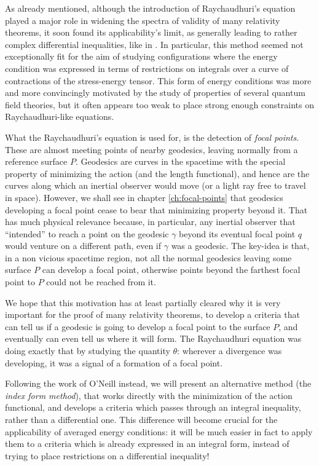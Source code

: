 As already mentioned, although the introduction of Raychaudhuri's equation played a major role in widening the spectra of validity of many relativity theorems, it soon found its applicability's limit, as generally leading to rather complex differential inequalities, like in \cite[]{fewster2011singularity}.
In particular, this method seemed not exceptionally fit for the aim of studying configurations where the energy condition was expressed in terms of restrictions on integrals over a curve of contractions of the stress-energy tensor. This form of energy conditions was more and more convincingly motivated by the study of properties of several quantum field theories, but it often appears too weak to place strong enough constraints on Raychaudhuri-like equations.

What the Raychaudhuri's equation is used for, is the detection of \emph{focal points}. These are almost meeting points of nearby geodesics, leaving normally from a reference surface \(P\). Geodesics are curves in the spacetime with the special property of minimizing the action (and the length functional), and hence are the curves along which an inertial observer would move (or a light ray free to travel in space). However, we shall see in chapter \ref{ch:focal-points} that geodesics developing a focal point cease to bear that minimizing property beyond it. 
That has much physical relevance because, in particular, any inertial observer that ``intended'' to reach a point on the geodesic \(\gamma\) beyond its eventual focal point \(q\) would venture on a different path, even if \(\gamma\) was a geodesic.
The key-idea is that, in a non vicious spacetime region, not all the normal geodesics leaving some surface \(P\) can develop a focal point, otherwise points beyond the farthest focal point to \(P\) could not be reached from it. 

We hope that this motivation has at least partially cleared why it is very important for the proof of many relativity theorems, to develop a criteria that can tell us if a geodesic is going to develop a focal point to the surface \(P\), and eventually can even tell us where it will form. The Raychaudhuri equation was doing exactly that by studying the quantity \(\theta\): wherever a divergence was developing, it was a signal of a formation of a focal point.

Following the work of O'Neill instead, we will present an alternative method (the \emph{index form method}), that works directly with the minimization of the action functional, and develops a criteria which passes through an integral inequality, rather than a differential one. This difference will become crucial for the applicability of averaged energy conditions: it will be much easier in fact to apply them to a criteria which is already expressed in an integral form, instead of trying to place restrictions on a differential inequality!

